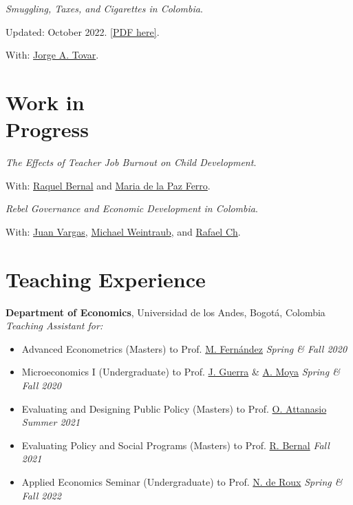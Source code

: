 \documentclass[margin,line]{res}
\newenvironment{list1}{
  \begin{list}{\ding{113}}{%
      \setlength{\itemsep}{0in}
      \setlength{\parsep}{0in} \setlength{\parskip}{0in}
      \setlength{\topsep}{0in} \setlength{\partopsep}{0in} 
      \setlength{\leftmargin}{0.17in}}}{\end{list}}
\begin{document}
\begin{resume}
\textit{Smuggling, Taxes, and Cigarettes in Colombia}.  
\begin{list1}
    \item[] Updated: October 2022.  \href{https://santiago-perezc.github.io/documents/paper-tobacco-draft3.pdf}{[PDF here]}.
    \item[] With: \href{https://sites.google.com/view/jorgetovar/home}{Jorge A. Tovar}.
\end{list1}

\section{\sc Work in \\ Progress}

\textit{The Effects of Teacher Job Burnout on Child Development}.
\begin{list1}
    \item[] With: \href{https://sites.google.com/view/raquelbernal}{Raquel Bernal} and \href{https://economics.ucsd.edu/graduate-program/about/grad-profiles/cohort%202021/Ferro-maria.html}{Maria de la Paz Ferro}.  
\end{list1}

\textit{Rebel Governance and Economic Development in Colombia}.
\begin{list1}
    \item[] With: \href{https://sites.google.com/site/juanfvargas/}{Juan Vargas},  \href{http://www.miweintraub.com/}{Michael Weintraub}, and  \href{https://wp.nyu.edu/rafaelch/}{Rafael Ch}.  
\end{list1}

\section{\sc Teaching Experience}

{\bf Department of Economics}, Universidad de los Andes, Bogotá, Colombia \\
{\em Teaching Assistant for:} \\
\vspace{-.3cm}
\begin{itemize}
    \item Advanced Econometrics (Masters) to Prof. \href{https://sites.google.com/view/manuelfernandezsierra}{M. Fernández} \hfill \emph{Spring  \& Fall 2020}
    \item Microeconomics I (Undergraduate) to Prof. \href{https://jguerraforero.wixsite.com/joseaguerra}{J. Guerra} \& \href{https://sites.google.com/view/andresmoya}{A. Moya} \hfill \emph{Spring \& Fall 2020}
    \item Evaluating and Designing Public Policy (Masters) to Prof. \href{http://www.orazioattanasio.org/}{O. Attanasio}  \hfill \emph{Summer 2021}
    \item Evaluating Policy and Social Programs (Masters) to Prof. \href{https://sites.google.com/view/raquelbernal}{R. Bernal}  \hfill \emph{Fall 2021}
    \item Applied Economics Seminar (Undergraduate) to Prof. \href{https://sites.google.com/site/nicoderoux/}{N. de Roux}  \hfill \emph{Spring \& Fall 2022}
\end{itemize}


\end{resume}
\end{document}
